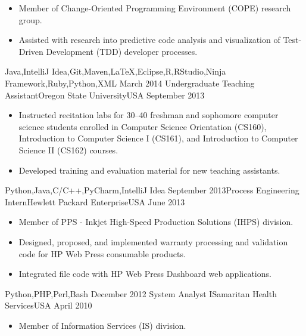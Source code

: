 \documentclass[localFont,alternative]{yaac-another-awesome-cv}
\begin{document}
\begin{experiences}
{\begin{itemize}
                        \item Member of Change-Oriented Programming Environment (COPE) research group.                       
                        \item Assisted with research into predictive code analysis and visualization of Test-Driven Development (TDD) developer processes.    
                      \end{itemize}
                    }
    {Java,IntelliJ Idea,Git,Maven,LaTeX,Eclipse,R,RStudio,Ninja Framework,Ruby,Python,XML}
  \emptySeparator
  \experience
    {March 2014}    {Undergraduate Teaching Assistant}{Oregon State University}{USA}
    {September 2013}{
                      \begin{itemize}
                        \item Instructed recitation labs for 30--40 freshman and sophomore computer science students enrolled in Computer Science Orientation (CS160), Introduction to Computer Science I (CS161), and Introduction to Computer Science II (CS162) courses.
                        \item Developed training and evaluation material for new teaching assistants.                                                                
                      \end{itemize}
                    }
    {Python,Java,C/C++,PyCharm,IntelliJ Idea}
  \emptySeparator
  \experience
    {September 2013}{Process Engineering Intern}{Hewlett Packard Enterprise}{USA}
    {June 2013}     {
                      \begin{itemize}
                        \item Member of PPS - Inkjet High-Speed Production Solutions (IHPS) division.                        
                        \item Designed, proposed, and implemented warranty processing and validation code for HP Web Press consumable products.                   
                        \item Integrated file code with HP Web Press Dashboard web applications.                                                                    
                      \end{itemize}
                    }
    {Python,PHP,Perl,Bash}
  \emptySeparator
  \experience
    {December 2012}    {System Analyst I}{Samaritan Health Services}{USA}
    {April 2010}{
                      \begin{itemize}
                        \item Member of Information Services (IS) division.

\end{itemize}}
\end{experiences}
\end{document}

